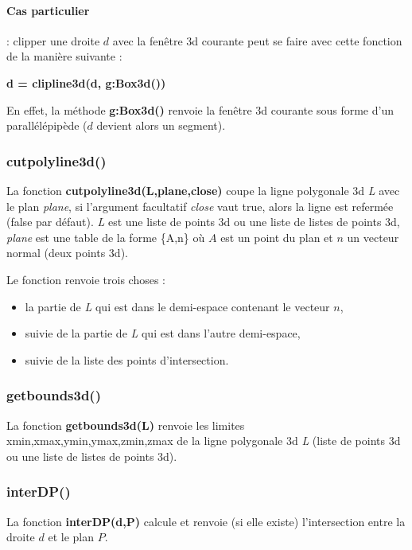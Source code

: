 \paragraph{Cas particulier} : clipper une droite $d$ avec la fenêtre 3d courante peut se faire avec cette fonction de la manière suivante :

\begin{center}
\textbf{d = clipline3d(d, g:Box3d())}
\end{center}

En effet, la méthode \textbf{g:Box3d()} renvoie la fenêtre 3d courante sous forme d'un parallélépipède ($d$ devient alors un segment).

\subsubsection{cutpolyline3d()}
La fonction \textbf{cutpolyline3d(L,plane,close)} coupe la ligne polygonale 3d \emph{L} avec le plan \emph{plane}, si l'argument facultatif \emph{close} vaut true, alors la ligne est refermée (false par défaut).
\emph{L} est une liste de points 3d ou une liste de listes de points 3d, \emph{plane} est une table de la forme \{A,n\} où $A$ est un point du plan et $n$ un vecteur normal (deux points 3d).

Le fonction renvoie trois choses :
\begin{itemize}
    \item la partie de \emph{L} qui est dans le demi-espace contenant le vecteur $n$,
    \item suivie de la partie de \emph{L} qui est dans l'autre demi-espace,
    \item suivie de la liste des points d'intersection.
\end{itemize}

\subsubsection{getbounds3d()}
La fonction \textbf{getbounds3d(L)} renvoie les limites xmin,xmax,ymin,ymax,zmin,zmax de la ligne polygonale 3d \emph{L} (liste de points 3d ou une liste de listes de points 3d).

\subsubsection{interDP()}
La fonction \textbf{interDP(d,P)} calcule et renvoie (si elle existe) l'intersection entre la droite $d$ et le plan $P$.

